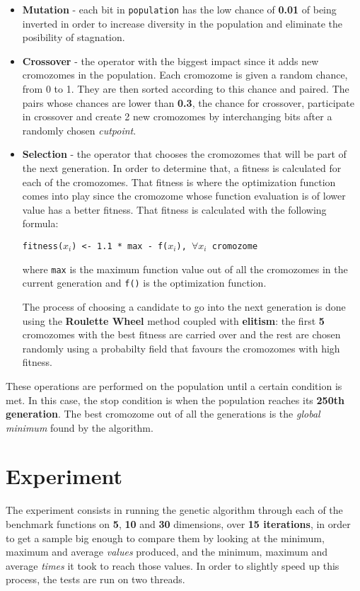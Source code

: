 \documentclass{article}
\begin{document}
\begin{itemize}
\item \textbf{Mutation} - each bit in \texttt{population} has the low chance
of \textbf{0.01} of being inverted in order to increase diversity in the 
population and eliminate the posibility of stagnation.
\item \textbf{Crossover} - the operator with the biggest impact since it adds
new cromozomes in the population. Each cromozome is given a random chance, from
0 to 1. They are then sorted according to this chance and paired. The pairs
whose chances are lower than \textbf{0.3}, the chance for crossover, participate 
in crossover and create 2 new cromozomes by interchanging bits after a 
randomly chosen \textit{cutpoint}.
\item \textbf{Selection} - the operator that chooses the cromozomes that will
be part of the next generation. In order to determine that, a fitness is
calculated for each of the cromozomes. That fitness is where the optimization
function comes into play since the cromozome whose function evaluation is 
of lower value has a better fitness. That fitness is calculated with the
following formula:

\texttt{fitness($x_i$) <- 1.1 * max - f($x_i$), $\forall x_i$ cromozome}

where \texttt{max} is the maximum function value out of all the cromozomes in
the current generation and \texttt{f()} is the optimization function.

The process of choosing a candidate to go into the next generation is done
using the \textbf{Roulette Wheel} method coupled with \textbf{elitism}: the 
first \textbf{5} cromozomes with the best fitness are carried over and the 
rest are chosen randomly using a probabilty field that favours the cromozomes 
with high fitness.
\end{itemize}

These operations are performed on the population until a certain condition is
met. In this case, the stop condition is when the population reaches
its \textbf{250th generation}. The best cromozome out of all the generations
is the \textit{global minimum} found by the algorithm.

\section{Experiment}
The experiment consists in running the genetic algorithm through each of the 
benchmark functions on \textbf{5}, \textbf{10} and \textbf{30} dimensions, over \textbf{15 iterations}, in order 
to get a sample big enough to compare them by looking at the minimum, maximum 
and average \textit{values} produced, and the minimum, maximum and average \textit{times} it 
took to reach those values. In order to slightly speed up this process, the 
tests are run on two threads.
\end{document}
